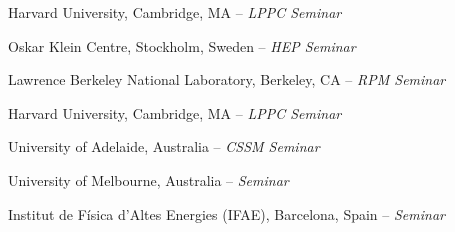 \documentclass[11pt,letterpaper]{article}
\begin{document}
\begin{itemizetighter}
    \item Harvard University, Cambridge, MA -- \emph{LPPC Seminar}  %


    \item Oskar Klein Centre, Stockholm, Sweden -- \emph{HEP Seminar} %
    \item Lawrence Berkeley National Laboratory, Berkeley, CA  -- \emph{RPM Seminar} %

    \item Harvard University, Cambridge, MA -- \emph{LPPC Seminar} %

    \item University of Adelaide, Australia -- \emph{CSSM Seminar} %
    \item University of Melbourne, Australia -- \emph{Seminar} %
    \item Institut de F\'isica d'Altes Energies (IFAE), Barcelona, Spain -- \emph{Seminar} %



\end{itemizetighter}
\end{document}
